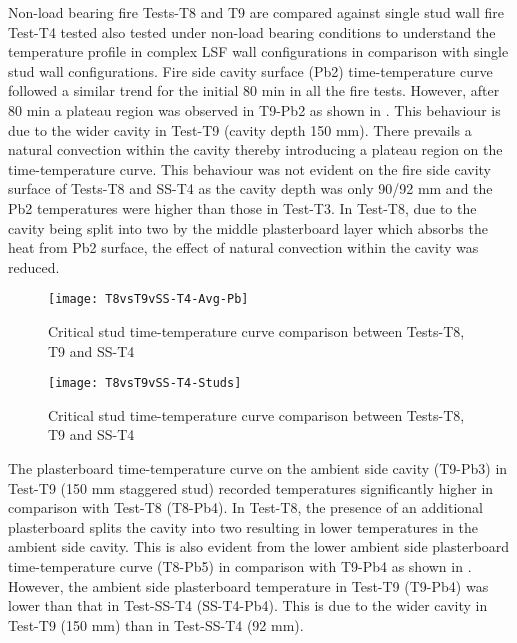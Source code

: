 Non-load bearing fire Tests-T8 and T9 are compared against single stud wall fire Test-T4 tested also tested under non-load bearing conditions to understand the temperature profile in complex LSF wall configurations in comparison with single stud wall configurations. Fire side cavity surface (Pb2) time-temperature curve followed a similar trend for the initial 80 min in all the fire tests. However, after 80 min a plateau region was observed in T9-Pb2 as shown in . This behaviour is due to the wider cavity in Test-T9 (cavity depth 150 mm). There prevails a natural convection within the cavity thereby introducing a plateau region on the time-temperature curve. This behaviour was not evident on the fire side cavity surface of Tests-T8 and SS-T4 as the cavity depth was only 90/92 mm and the Pb2 temperatures were higher than those in Test-T3. In Test-T8, due to the cavity being split into two by the middle plasterboard layer which absorbs the heat from Pb2 surface, the effect of natural convection within the cavity was reduced.
\begin{figure}[!htbp]
	\centering
		\texttt{[image: T8vsT9vSS-T4-Avg-Pb]}  
	\caption{Critical stud time-temperature curve comparison between Tests-T8, T9 and SS-T4}
	\label{fig:T8vsT9vSS-T4-Avg-Pb}
\end{figure}
\begin{figure}[!htbp]
	\centering
		\texttt{[image: T8vsT9vSS-T4-Studs]}  
	\caption{Critical stud time-temperature curve comparison between Tests-T8, T9 and SS-T4}
	\label{fig:T8vsT9vSS-T4-Studs}
\end{figure}

The plasterboard time-temperature curve on the ambient side cavity (T9-Pb3) in Test-T9 (150 mm staggered stud) recorded temperatures significantly higher in comparison with Test-T8 (T8-Pb4). In Test-T8, the presence of an additional plasterboard splits the cavity into two resulting in lower temperatures in the ambient side cavity. This is also evident from the lower ambient side plasterboard time-temperature curve (T8-Pb5) in comparison with T9-Pb4 as shown in  . However, the ambient side plasterboard temperature in Test-T9 (T9-Pb4) was lower than that in Test-SS-T4 (SS-T4-Pb4). This is due to the wider cavity in Test-T9 (150 mm) than in Test-SS-T4 (92 mm).

